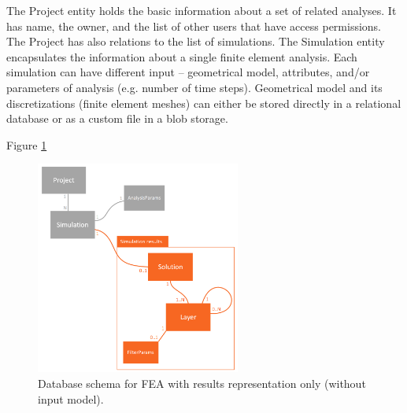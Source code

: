 The Project entity holds the basic information about a set of related analyses. It has name, the owner, and the list of other users that have access permissions. The Project has also relations to the list of simulations. The Simulation entity encapsulates the information about a single finite element analysis. Each simulation can have different input -- geometrical model, attributes, and/or parameters of analysis (e.g. number of time steps). Geometrical model and its discretizations (finite element meshes) can either be stored directly in a relational database or as a custom file in a blob storage.



Figure \ref{fig:FEA-db-schema-results}


\begin{figure}[H]
    \centering
    \includegraphics[width=0.6\textwidth]{figures/FEA-database-schema-only-results}
    \decoRule
    \caption{Database schema for FEA with results representation only (without input model).}
    \label{fig:FEA-db-schema-results}
\end{figure}


